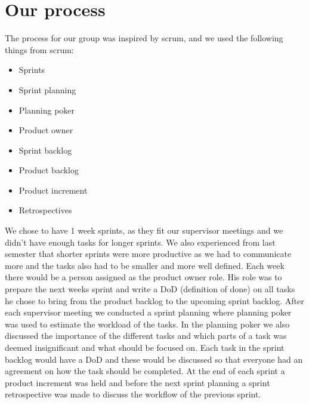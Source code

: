 \section{Our process}
The process for our group was inspired by scrum, and we used the following things from scrum:

\begin{itemize}
    \item Sprints 
    \item Sprint planning 
    \item Planning poker 
    \item Product owner 
    \item Sprint backlog 
    \item Product backlog   
    \item Product increment 
    \item Retrospectives 
\end{itemize}

\noindent
We chose to have 1 week sprints, as they fit our supervisor meetings and we didn't have enough tasks for longer sprints.
We also experienced from last semester that shorter sprints were more productive as we had to communicate more and the tasks also had to be smaller and more well defined. 
Each week there would be a person assigned as the product owner role.
His role was to prepare the next weeks sprint and write a DoD (definition of done) on all tasks he chose to bring from the product backlog to the upcoming sprint backlog.
After each supervisor meeting we conducted a sprint planning where planning poker was used to estimate the workload of the tasks.
In the planning poker we also discussed the importance of the different tasks and which parts of a task was deemed insignificant and what should be focused on.
Each task in the sprint backlog would have a DoD and these would be discussed so that everyone had an agreement on how the task should be completed.
At the end of each sprint a product increment was held and before the next sprint planning a sprint retrospective was made to discuss the workflow of the previous sprint.
